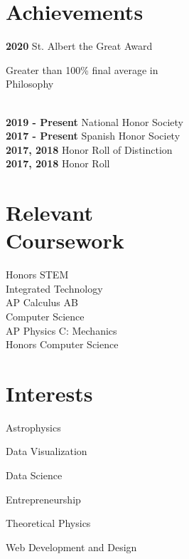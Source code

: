\documentclass[]{deedy-resume-openfont}
\begin{document}
\begin{minipage}[t]{0.33\textwidth}

\section{Achievements} 
\textbf{2020 } St. Albert the Great Award \\
\hspace{2mm} \begin{small}Greater than 100\% final average in \\
\hspace{2mm}  Philosophy
\end{small}\\
\textbf{2019 - Present } National Honor Society \\
\textbf{2017 - Present } Spanish Honor Society\\
\textbf{2017, 2018 } Honor Roll of Distinction\\
\textbf{2017, 2018 } Honor Roll
\sectionsep



\section{Relevant\\Coursework}
Honors STEM \\
Integrated Technology \\
AP Calculus AB \\
Computer Science \\
AP Physics C: Mechanics \\
Honors Computer Science
\sectionsep

\section{Interests}
\vspace{\topsep}
\begin{tightemize}
\item Astrophysics 
\item Data Visualization
\item Data Science
\item Entrepreneurship
\item Theoretical Physics
\item Web Development and Design
\end{tightemize}
\sectionsep



\pagestyle{fancy}

\end{minipage}%
\end{document}
